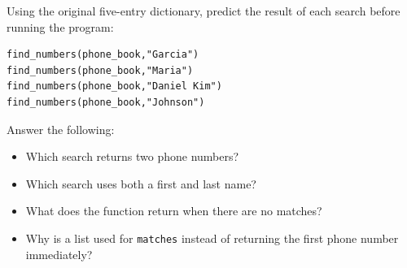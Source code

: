 \documentclass{article}
\begin{document}
Using the original five-entry dictionary, predict the result of
each search before running the program:

\begin{verbatim}
find_numbers(phone_book,"Garcia")
find_numbers(phone_book,"Maria")
find_numbers(phone_book,"Daniel Kim")
find_numbers(phone_book,"Johnson")
\end{verbatim}

\noindent
Answer the following:
\begin{itemize}
\item Which search returns two phone numbers?
\item Which search uses both a first and last name?
\item What does the function return when there are no matches?
\item Why is a list used for \texttt{matches} instead of returning the first phone number immediately?
\end{itemize}
\end{document}
